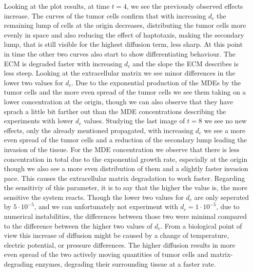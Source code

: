 Looking at the plot results, at time $t=4$, we see the previously observed effects increase. The curves of the tumor cells confirm that with increasing $d_c$ the remaining lump of cells at the origin decreases, distributing the tumor cells more evenly in space and also reducing the effect of haptotaxis, making the secondary lump, that is still visible for the highest diffusion term, less sharp. At this point in time the other two curves also start to show differentiating behaviour. The ECM is degraded faster with increasing $d_c$ and the slope the ECM describes is less steep. Looking at the extracellular matrix we see minor differences in the lower two values for $d_c$. Due to the exponential production of the MDEs by the tumor cells and the more even spread of the tumor cells we see them taking on a lower concentration at the origin, though we can also observe that they have sprach a little bit farther out than the MDE concentrations describing the experiments with lower $d_c$ values.\newline
Studying the last image of $t=8$ we see no new effects, only the already mentioned propagated, with increasing $d_c$ we see a more even spread of the tumor cells and a reduction of the secondary lump leading the invasion of the tissue. For the MDE concentration we observe that there is less concentration in total due to the exponential growth rate, especially at the origin though we also see a more even distribution of them and a slightly faster invasion pace. This causes the extracellular matrix degradation to work faster.\newline 
Regarding the sensitiviy of this parameter, it is to say that the higher the value is, the more sensitive the system reacts. Though the lower two values for $d_c$ are only seperated by $5\cdot 10^{-5}$, and we can unfortunately not experiment with $d_c=1 \cdot 10^{-5}$, due to numerical instabilities, the differences between those two were minimal compared to the difference between the higher two values of $d_c$.\newline 
From a biological point of view this increase of diffusion might be caused by a change of temperature, electric potential, or pressure differences. The higher diffusion results in more even spread of the two actively moving quantities of tumor cells and matrix-degrading enzymes, degrading their surrounding tissue at a faster rate.

